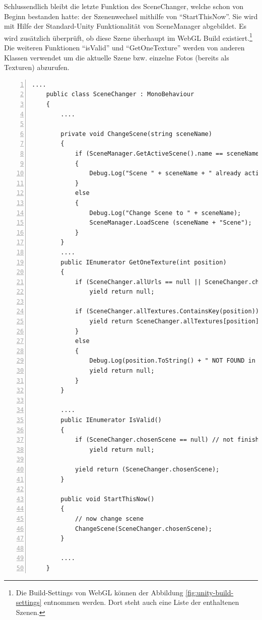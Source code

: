 Schlussendlich bleibt die letzte Funktion des SceneChanger, welche schon von Beginn bestanden hatte: der Szenenwechsel mithilfe von ``StartThisNow''. Sie wird mit Hilfe der Standard-Unity Funktionalität von SceneManager abgebildet. Es wird zusätzlich überprüft, ob diese Szene überhaupt im WebGL Build existiert.\footnote{Die Build-Settings von WebGL können der Abbildung \ref{fig:unity-build-settings} entnommen werden. Dort steht auch eine Liste der enthaltenen Szenen.} Die weiteren Funktionen ``isValid'' und ``GetOneTexture'' werden von anderen Klassen verwendet um die aktuelle Szene bzw. einzelne Fotos (bereits als Texturen) abzurufen.


\begin{lstlisting}[numbers=left,caption={SceneChanger},label={lst:unity-scene-changer-public}]
....
    public class SceneChanger : MonoBehaviour
    {
        ....
        
        private void ChangeScene(string sceneName)
        {
            if (SceneManager.GetActiveScene().name == sceneName + "Scene" || (sceneName == "ERROR"))
            {
                Debug.Log("Scene " + sceneName + " already active!");
            }
            else 
            {
                Debug.Log("Change Scene to " + sceneName);
                SceneManager.LoadScene (sceneName + "Scene");
            }
        }
        ....
        public IEnumerator GetOneTexture(int position)
        {
            if (SceneChanger.allUrls == null || SceneChanger.chosenScene == null) // not finished call to backend
                yield return null;
                
            if (SceneChanger.allTextures.ContainsKey(position)) {
                yield return SceneChanger.allTextures[position];
            }
            else 
            {
                Debug.Log(position.ToString() + " NOT FOUND in MemoryLand!");
                yield return null;
            }
        }
    
        ....    
        public IEnumerator IsValid()
        {
            if (SceneChanger.chosenScene == null) // not finished call to backend
                yield return null;
                
            yield return (SceneChanger.chosenScene);
        }
    
        public void StartThisNow()
        {
            // now change scene
            ChangeScene(SceneChanger.chosenScene);
        }
    
        ....
    }
\end{lstlisting}

